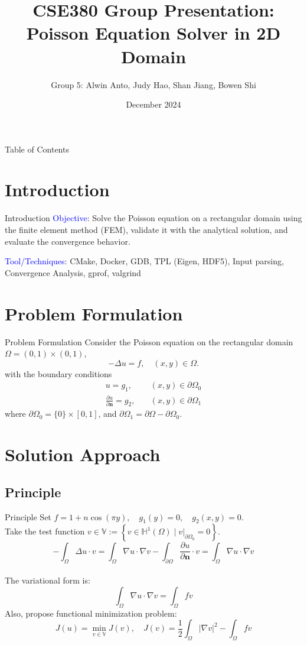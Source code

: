 \documentclass{beamer}
\title{CSE380 Group Presentation:\\
Poisson Equation Solver in 2D Domain}
\author{Group 5: Alwin Anto, Judy Hao, Shan Jiang, Bowen Shi}
\date{December 2024}
\begin{document}
\frame{\titlepage}
\begin{frame}[t]{Table of Contents}
    \small %
    \tableofcontents[hideallsubsections]
\end{frame}

\section{Introduction}
\begin{frame}{Introduction}
\textcolor{blue}{Objective}: Solve the Poisson equation on a rectangular domain using the finite element method (FEM), validate it with the analytical solution, and evaluate the convergence behavior.\vspace{0.5cm}

\textcolor{blue}{Tool/Techniques}: CMake, Docker, GDB, TPL (Eigen, HDF5), Input parsing, Convergence Analysis, gprof, valgrind
\end{frame}

\section{Problem Formulation}
\begin{frame}{Problem Formulation}
Consider the Poisson equation on the rectangular domain $\Omega=(0,1) \times (0,1)$,
$$
-\Delta u = f, \quad (x, y) \in \Omega.
$$
with the boundary conditions
\begin{align*}
    u = g_1,\quad& (x, y) \in \partial \Omega_0 \\
\frac{\partial u}{\partial \boldsymbol{n}} = g_2, \quad& (x, y) \in \partial \Omega_1
\end{align*}
where $\partial \Omega_0 = \{0\} \times [0,1]$, and $\partial \Omega_1 = \partial \Omega - \partial \Omega_0$.
\end{frame}

\section{Solution Approach}
\subsection{Principle}
\begin{frame}{Principle}
Set $f = 1 + n \cos(\pi y), \quad g_1(y)=0,\quad g_2(x, y)=0.$
\\Take the test function $v \in \mathbb{V}:=\left\{v \in \mathbb{H}^{1}(\Omega) \mid v|_{\partial \Omega_{0}}=0\right\}$.
\\ $$
-\int_{\Omega} \Delta u \cdot v=\int_{\Omega} \nabla u \cdot \nabla v-\int_{\partial \Omega} \frac{\partial u}{\partial \boldsymbol{n}} \cdot v=\int_{\Omega} \nabla u \cdot \nabla v
$$
\\The variational form is: \begin{equation*}
\int_{\Omega} \nabla u \cdot \nabla v=\int_{\Omega} f v
\end{equation*}
\pause
Also, propose functional minimization problem: 
$$
J(u)=\min_{v \in \mathbb{V}} J(v),\quad J(v)=\frac{1}{2} \int_{\Omega}|\nabla v|^{2}-\int_{\Omega} f v
$$
\end{frame}
\end{document}
